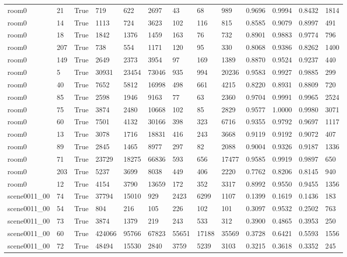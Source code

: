 \begin{tabular}{lllllllllllll}
room0 & 21 & True & 719 & 622 & 2697 & 43 & 68 & 989 & 0.9696 & 0.9994 & 0.8432 & 1814 \\
room0 & 14 & True & 1113 & 724 & 3623 & 102 & 116 & 815 & 0.8585 & 0.9079 & 0.8997 & 491 \\
room0 & 18 & True & 1842 & 1376 & 1459 & 163 & 76 & 732 & 0.8901 & 0.9883 & 0.9774 & 796 \\
room0 & 207 & True & 738 & 554 & 1171 & 120 & 95 & 330 & 0.8068 & 0.9386 & 0.8262 & 1400 \\
room0 & 149 & True & 2649 & 2373 & 3954 & 97 & 169 & 1389 & 0.8870 & 0.9524 & 0.9237 & 440 \\
room0 & 5 & True & 30931 & 23454 & 73046 & 935 & 994 & 20236 & 0.9583 & 0.9927 & 0.9885 & 299 \\
room0 & 40 & True & 7652 & 5812 & 16998 & 498 & 661 & 4215 & 0.8220 & 0.8931 & 0.8809 & 720 \\
room0 & 85 & True & 2598 & 1946 & 9163 & 77 & 63 & 2360 & 0.9704 & 0.9991 & 0.9965 & 2524 \\
room0 & 75 & True & 3874 & 2480 & 10668 & 102 & 85 & 2829 & 0.9577 & 1.0000 & 0.9980 & 3071 \\
room0 & 60 & True & 7501 & 4132 & 30166 & 398 & 323 & 6716 & 0.9355 & 0.9792 & 0.9697 & 1117 \\
room0 & 13 & True & 3078 & 1716 & 18831 & 416 & 243 & 3668 & 0.9119 & 0.9192 & 0.9072 & 407 \\
room0 & 89 & True & 2845 & 1465 & 8977 & 297 & 82 & 2088 & 0.9004 & 0.9326 & 0.9187 & 1336 \\
room0 & 71 & True & 23729 & 18275 & 66836 & 593 & 656 & 17477 & 0.9585 & 0.9919 & 0.9897 & 650 \\
room0 & 203 & True & 5237 & 3699 & 8038 & 449 & 406 & 2220 & 0.7762 & 0.8206 & 0.8145 & 940 \\
room0 & 12 & True & 4154 & 3790 & 13659 & 172 & 352 & 3317 & 0.8992 & 0.9550 & 0.9455 & 1356 \\
scene0011\_00 & 74 & True & 37794 & 15010 & 929 & 2423 & 6299 & 1107 & 0.1399 & 0.1619 & 0.1436 & 183 \\
scene0011\_00 & 54 & True & 804 & 216 & 105 & 226 & 102 & 101 & 0.3097 & 0.9532 & 0.2502 & 763 \\
scene0011\_00 & 73 & True & 3874 & 1379 & 219 & 243 & 533 & 312 & 0.3900 & 0.4865 & 0.3953 & 250 \\
scene0011\_00 & 60 & True & 424066 & 95766 & 67823 & 55651 & 17188 & 35569 & 0.3728 & 0.6421 & 0.5593 & 1556 \\
scene0011\_00 & 72 & True & 48494 & 15530 & 2840 & 3759 & 5239 & 3103 & 0.3215 & 0.3618 & 0.3352 & 245 \\

\end{tabular}

